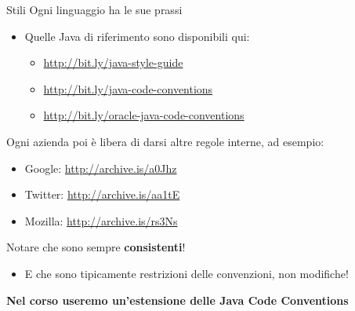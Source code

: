 \documentclass[presentation]{beamer}
\begin{document}
\begin{frame}{Stili}
	Ogni linguaggio ha le sue prassi
	\begin{itemize}
		\item Quelle Java di riferimento sono disponibili qui:
		\tiny
		\begin{itemize}
			\item \url{http://bit.ly/java-style-guide}
			\item \url{http://bit.ly/java-code-conventions}
			\item \url{http://bit.ly/oracle-java-code-conventions}
		\end{itemize}
	\end{itemize}
	Ogni azienda poi è libera di darsi altre regole interne, ad esempio:
	\footnotesize
	\begin{itemize}
		\item Google: \url{http://archive.is/a0Jhz}
 		\item Twitter: \url{http://archive.is/aa1tE}
 		\item Mozilla: \url{http://archive.is/rs3Ns}
	\end{itemize}
	\normalsize
	Notare che sono sempre \textbf{consistenti}!
	\begin{itemize}
		\item E che sono tipicamente restrizioni delle convenzioni, non modifiche!
	\end{itemize}
	\begin{center}
		\textbf{Nel corso useremo un'estensione delle Java Code Conventions}
	\end{center}
\end{frame}
\end{document}
